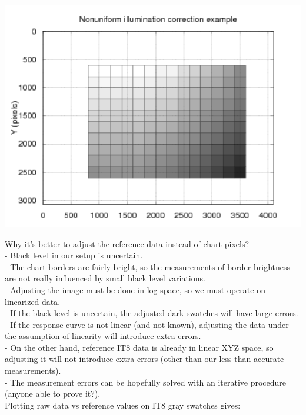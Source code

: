 \begin{center}
\includegraphics[height=10cm]{images/it8_lum_correction_2d}
\end{center}

Why it's better to adjust the reference data instead of chart pixels?\\

- Black level in our setup is uncertain.\\
- The chart borders are fairly bright, so the measurements of border brightness are not really influenced by small black level variations.\\
- Adjusting the image must be done in log space, so we must operate on linearized data.\\
- If the black level is uncertain, the adjusted dark swatches will have large errors.\\
- If the response curve is not linear (and not known), adjusting the data under the assumption of linearity will introduce extra errors.\\
- On the other hand, reference IT8 data is already in linear XYZ space, so adjusting it will not introduce extra errors (other than our less-than-accurate measurements).\\
- The measurement errors can be hopefully solved with an iterative procedure (anyone able to prove it?).\\ 

Plotting raw data vs reference values on IT8 gray swatches gives:\\

